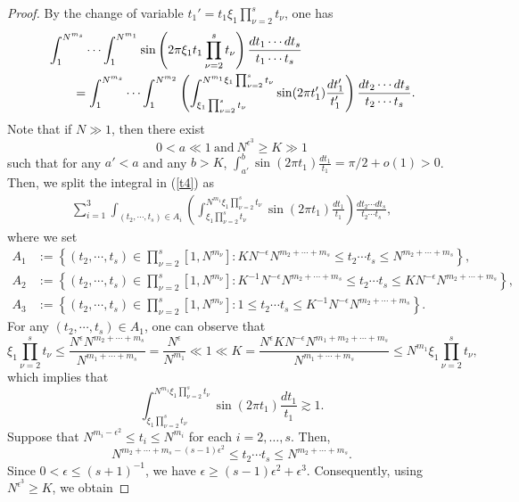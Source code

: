 \documentclass[10pt,a4paper]{amsart}
\numberwithin{equation}{section}
\begin{document}
\begin{proof}
 By the change of variable $t_1'=t_1 \xi_1 \prod_{\nu=2}^s t_\nu $, one has
\begin{align}\label{t4}
&\int_{1}^{N^{m_s}}  \cdots \int_{1}^{N^{m_1}}  \sin\left(2\pi \xi_1t_1 \prod_{\nu=2}^s t_\nu \right) \frac{dt_1\cdots dt_s}{t_1\cdots t_s}\notag\\
&\qquad=\int_{1}^{N^{m_s}}  \cdots \int_{1}^{N^{m_2}}\left(  \int_{\xi_1 \prod_{\nu=2}^s t_\nu  }^{N^{m_1}\xi_1 \prod_{\nu=2}^s t_\nu }\sin(2\pi t_1' ) \frac{dt_1'}{t_1'}\right) \frac{dt_2\cdots dt_s}{t_2\cdots t_s}.
\end{align} Note that  if $N\gg 1 $, then there exist  $$0<a\ll 1 \ \text{and} \  N^{\epsilon^{3}}\ge K\gg1$$ such  that  for any $a'<a$ and  any $b>K$,  $ \int_{a'}^{b }\sin(2\pi t_1 ) \frac{dt_1}{t_1}=\pi/2+o(1)>0$.
Then, we split  the integral in (\ref{t4}) as
 \begin{align*}
\sum_{i=1}^3 \int_{(t_2,\cdots,t_s)\in A_i}   \left( \int_{\xi_1 \prod_{\nu=2}^s t_\nu  }^{N^{m_1}\xi_1 \prod_{\nu=2}^s t_\nu }\sin(2\pi t_1 ) \frac{dt_1}{t_1}\right) \frac{dt_2\cdots dt_s}{t_2\cdots t_s},
\end{align*}
where we set
\begin{align*}
A_1&:=\left\{(t_2,\cdots, t_s)\in \prod_{\nu=2}^s[1,N^{m_\nu}]:   KN^{-\epsilon} N^{m_2+\cdots+m_s} \le t_2 \cdots t_s\le  N^{m_2+\cdots+m_s}\right\},\\
A_2&:=\left\{(t_2,\cdots, t_s)\in \prod_{\nu=2}^s[1,N^{m_\nu}]:  K^{-1}N^{-\epsilon}   N^{m_2+\cdots+m_s} \le t_2 \cdots t_s\le K N^{-\epsilon} N^{m_2+\cdots+m_s}\right\},\\
A_3&:=\left\{(t_2,\cdots, t_s)\in \prod_{\nu=2}^s[1,N^{m_\nu}]:   1\le t_2 \cdots t_s\le  K^{-1}N^{-\epsilon} N^{m_2+\cdots+m_s}\right\}.
\end{align*}
For any $(t_2,\cdots,t_s)\in A_1$, one can observe that 
$$  \xi_1 \prod_{\nu=2}^s t_\nu\le \frac{N^{\epsilon}  N^{m_2+\cdots+m_s} }{N^{m_1+\cdots+m_s}}=\frac{N^{\epsilon}}{N^{m_1}} \ll 1 \ll K= \frac{N^{\epsilon} K N^{-\epsilon} N^{m_1+m_2+\cdots+m_s}}{N^{m_1+\cdots+m_s}}\le 
N^{m_1} \xi_1 \prod_{\nu=2}^s t_\nu,   $$ which implies that $$\int_{\xi_1 \prod_{\nu=2}^s t_\nu  }^{N^{m_1}\xi_1 \prod_{\nu=2}^s t_\nu }\sin(2\pi t_1 ) \frac{dt_1}{t_1}\gtrsim 1 .$$
Suppose that $N^{m_i-\epsilon^2}\le t_i\le N^{m_i}$ for each $i=2,\dots,s.$ Then,
$$N^{m_2+\cdots+m_s-(s-1)\epsilon^2}
\le t_2\cdots t_s
\le N^{m_2+\cdots+m_s}.$$ Since $0<\epsilon\le (s+1)^{-1}$, we have
$\epsilon\ge (s-1)\epsilon^2+ \epsilon^3.$ Consequently, using $N^{\epsilon^3}\ge K$, we obtain

\end{proof}
\end{document}
